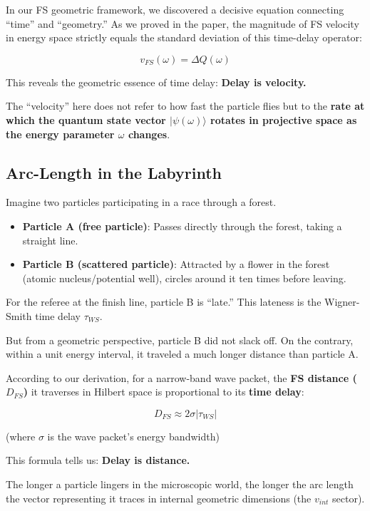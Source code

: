 In our FS geometric framework, we discovered a decisive equation connecting ``time'' and ``geometry.'' As we proved in the paper, the magnitude of FS velocity in energy space strictly equals the standard deviation of this time-delay operator:

\[v_{FS}(\omega) = \Delta Q(\omega)\]

This reveals the geometric essence of time delay: \textbf{Delay is velocity.}

The ``velocity'' here does not refer to how fast the particle flies but to the \textbf{rate at which the quantum state vector $| \psi(\omega) \rangle$ rotates in projective space as the energy parameter $\omega$ changes}.

\subsection{Arc-Length in the Labyrinth}

Imagine two particles participating in a race through a forest.

\begin{itemize}
\item \textbf{Particle A (free particle)}: Passes directly through the forest, taking a straight line.

\item \textbf{Particle B (scattered particle)}: Attracted by a flower in the forest (atomic nucleus/potential well), circles around it ten times before leaving.
\end{itemize}

For the referee at the finish line, particle B is ``late.'' This lateness is the Wigner-Smith time delay $\tau_{WS}$.

But from a geometric perspective, particle B did not slack off. On the contrary, within a unit energy interval, it traveled a much longer distance than particle A.

According to our derivation, for a narrow-band wave packet, the \textbf{FS distance ($D_{FS}$)} it traverses in Hilbert space is proportional to its \textbf{time delay}:

\[D_{FS} \approx 2 \sigma |\tau_{WS}|\]

(where $\sigma$ is the wave packet's energy bandwidth)

This formula tells us: \textbf{Delay is distance.}

The longer a particle lingers in the microscopic world, the longer the arc length the vector representing it traces in internal geometric dimensions (the $v_{int}$ sector).

